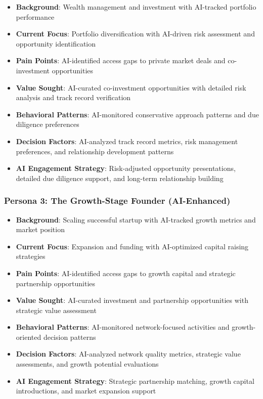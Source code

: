 \begin{itemize}
    \item \textbf{Background}: Wealth management and investment with AI-tracked portfolio performance
    \item \textbf{Current Focus}: Portfolio diversification with AI-driven risk assessment and opportunity identification
    \item \textbf{Pain Points}: AI-identified access gaps to private market deals and co-investment opportunities
    \item \textbf{Value Sought}: AI-curated co-investment opportunities with detailed risk analysis and track record verification
    \item \textbf{Behavioral Patterns}: AI-monitored conservative approach patterns and due diligence preferences
    \item \textbf{Decision Factors}: AI-analyzed track record metrics, risk management preferences, and relationship development patterns
    \item \textbf{AI Engagement Strategy}: Risk-adjusted opportunity presentations, detailed due diligence support, and long-term relationship building
\end{itemize}

\subsubsection{Persona 3: The Growth-Stage Founder (AI-Enhanced)}

\begin{itemize}
    \item \textbf{Background}: Scaling successful startup with AI-tracked growth metrics and market position
    \item \textbf{Current Focus}: Expansion and funding with AI-optimized capital raising strategies
    \item \textbf{Pain Points}: AI-identified access gaps to growth capital and strategic partnership opportunities
    \item \textbf{Value Sought}: AI-curated investment and partnership opportunities with strategic value assessment
    \item \textbf{Behavioral Patterns}: AI-monitored network-focused activities and growth-oriented decision patterns
    \item \textbf{Decision Factors}: AI-analyzed network quality metrics, strategic value assessments, and growth potential evaluations
    \item \textbf{AI Engagement Strategy}: Strategic partnership matching, growth capital introductions, and market expansion support
\end{itemize}

